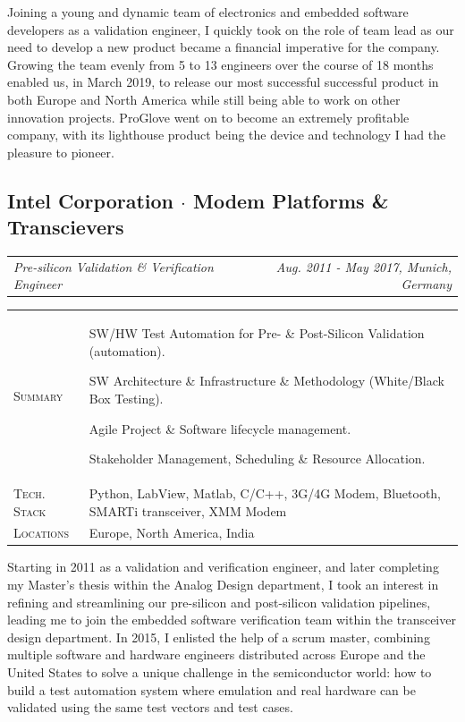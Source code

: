 \documentclass[10pt,a4paper]{moderncv}
\newcommand*{\makecareersubsection}[5]{
    \subsection{#1 {\color{color2}$\cdot$ #2}}
    \addvspace{-0.5em}
    {\color{color2}
    \begin{tabularx}{\textwidth}{LR}
        {\itshape #3} & {\itshape #4, #5}
    \end{tabularx}}
    \par\addvspace{1em}
    }
\begin{document}
    \vspace{1.5em}

    Joining a young and dynamic team of electronics and embedded software developers as a validation engineer, I quickly took on the role of team lead as our need to develop a new product became a financial imperative for the company. Growing the team evenly from 5 to 13 engineers over the course of 18 months enabled us, in March 2019, to release our most successful successful product in both Europe and North America while still being able to work on other innovation projects. ProGlove went on to become an extremely profitable company, with its lighthouse product being the device and technology I had the pleasure to pioneer.

\vspace{0.75em}

\makecareersubsection{Intel Corporation}{Modem Platforms \& Transcievers}{Pre-silicon Validation \& Verification Engineer}{Aug. 2011 - May 2017}{Munich, Germany}

    \vspace{1.5em}

    \begin{tabularx}{\textwidth}{>{\scshape}l@{\hskip 3.5mm}L}
        Summary & SW/HW Test Automation for Pre- \& Post-Silicon Validation (automation).
        \par SW Architecture \& Infrastructure \& Methodology (White/Black Box Testing).
        \par Agile Project \& Software lifecycle management. 
        \par Stakeholder Management, Scheduling \& Resource Allocation.\\
        Tech. Stack & Python, LabView, Matlab, C/C++, 3G/4G Modem, Bluetooth, SMARTi transceiver, XMM Modem\\
        Locations & Europe, North America, India\\
    \end{tabularx}

    \vspace{1.5em}

    Starting in 2011 as a validation and verification engineer, and later completing my Master's thesis within the Analog Design department, I took an interest in refining and streamlining our pre-silicon and post-silicon validation pipelines, leading me to join the embedded software verification team within the transceiver design department. In 2015, I enlisted the help of a scrum master, combining multiple software and hardware engineers distributed across Europe and the United States to solve a unique challenge in the semiconductor world: how to build a test automation system where emulation and real hardware can be validated using the same test vectors and test cases.
\end{document}
